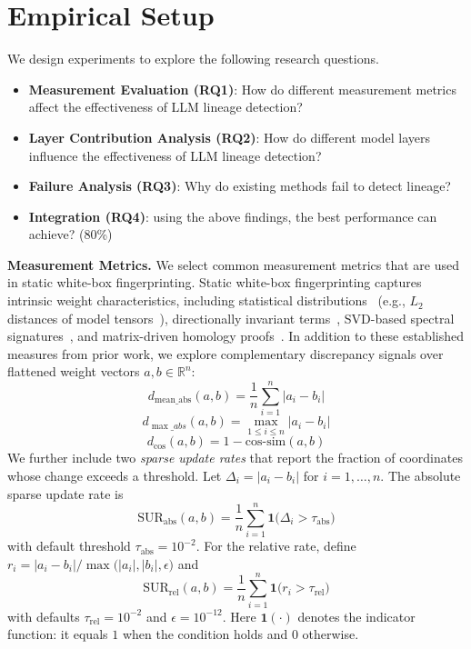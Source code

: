 \section{Empirical Setup}

We design experiments to explore the following research questions. 

\begin{itemize}[leftmargin=*]
    \item \textbf{Measurement Evaluation (RQ1)}: How do different measurement metrics affect the effectiveness of LLM lineage detection?
    \item \textbf{Layer Contribution Analysis (RQ2)}: How do different model layers influence the effectiveness of LLM lineage detection?

    \item \textbf{Failure Analysis (RQ3)}: Why do existing methods fail to detect lineage?

    \item \textbf{Integration (RQ4)}: using the above findings, the best performance can achieve? (80\%)
\end{itemize}


\textbf{Measurement Metrics.} We select common measurement metrics that are used in static white-box fingerprinting. Static white-box fingerprinting captures intrinsic weight characteristics, including statistical distributions~\cite{yoon2025intrinsic} (e.g., $L_2$ distances of model tensors~\cite{horwitz2024unsupervised}), directionally invariant terms~\cite{zeng2024huref}, SVD-based spectral signatures~\cite{wang2025ghost}, and matrix-driven homology proofs~\cite{zhang2025matrix}. In addition to these established measures from prior work, we explore complementary discrepancy signals over flattened weight vectors $a,b\in\mathbb{R}^n$:
$$d_{\mathrm{mean\_abs}}(a,b) = \frac{1}{n} \sum_{i=1}^{n} |a_i - b_i|$$
$$d_{\max\_abs}(a,b) = \max_{1 \leq i \leq n} |a_i - b_i|$$
$$d_{\cos}(a,b) = 1 - \mathrm{cos\text{-}sim}(a,b)$$
We further include two \emph{sparse update rates} that report the fraction of coordinates whose change exceeds a threshold. Let $\Delta_i=|a_i-b_i|$ for $i=1,\ldots,n$. The absolute sparse update rate is
$$\mathrm{SUR}_{\mathrm{abs}}(a,b) = \frac{1}{n} \sum_{i=1}^{n} \mathbf{1}\bigl(\Delta_i > \tau_{\mathrm{abs}}\bigr)$$
with default threshold $\tau_{\mathrm{abs}}=10^{-2}$. For the relative rate, define $r_i = |a_i-b_i| / \max\bigl(|a_i|,|b_i|,\epsilon\bigr)$ and
$$\mathrm{SUR}_{\mathrm{rel}}(a,b) = \frac{1}{n} \sum_{i=1}^{n} \mathbf{1}\bigl(r_i > \tau_{\mathrm{rel}}\bigr)$$
with defaults $\tau_{\mathrm{rel}}=10^{-2}$ and $\epsilon=10^{-12}$. Here $\mathbf{1}(\cdot)$ denotes the indicator function: it equals $1$ when the condition holds and $0$ otherwise.

